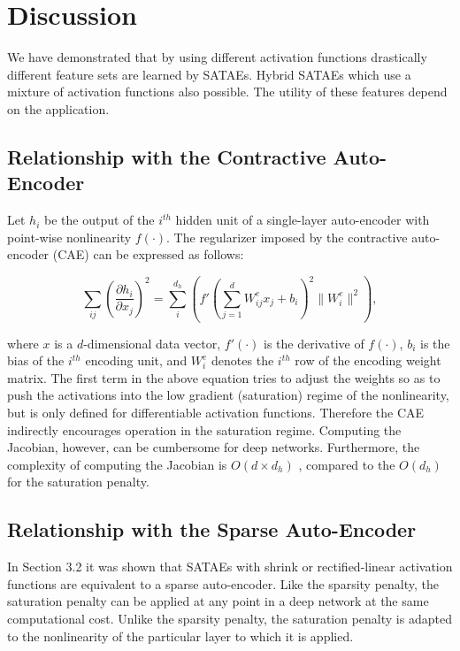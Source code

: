 \documentclass{article} %
\begin{document}
\section{Discussion}
We have demonstrated that by using different activation functions drastically different feature sets are learned by SATAEs. Hybrid SATAEs which use a mixture of activation functions also possible. The utility of these features depend on the application.  

\subsection{Relationship with the Contractive Auto-Encoder} 
Let $h_i$ be the output of the $i^{th}$ hidden unit of a single-layer auto-encoder with point-wise nonlinearity $f(\cdot)$. The regularizer imposed by the contractive auto-encoder (CAE) can be expressed as follows: 

\begin{equation}
\nonumber
\sum_{ij} \left(\frac{\partial h_i}{\partial x_j} \right)^2 = \sum_i ^{d_h} \left(f'(\sum_{j=1}^d W^e_{ij}x_j + b_i)^2 \| W^e_i \| ^2 \right),
\end{equation}  
 
\noindent
where $x$ is a $d$-dimensional data vector, $f'(\cdot)$ is the derivative of $f(\cdot)$, $b_i$ is the bias of the $i^{th}$ encoding unit, and $W^e_i$ denotes the $i^{th}$ row of the encoding weight matrix. The first term in the above equation tries to adjust the weights so as to push the activations into the low gradient (saturation) regime of the nonlinearity, but is only defined for differentiable activation functions. Therefore the CAE indirectly encourages operation in the saturation regime. Computing the Jacobian, however, can be cumbersome for deep networks. Furthermore, the complexity of computing the Jacobian is $O(d \times d_h)$ \cite{CAE}, compared to the $O(d_h)$ for the saturation penalty.  

 
\subsection{Relationship with the Sparse Auto-Encoder}

In Section 3.2 it was shown that SATAEs with shrink or rectified-linear activation functions are equivalent to a sparse auto-encoder. Like the sparsity penalty, the saturation penalty can be applied at any point in a deep network at the same computational cost. Unlike the sparsity penalty, the saturation penalty is adapted to the nonlinearity of the particular layer to which it is applied. 
 
\end{document}
